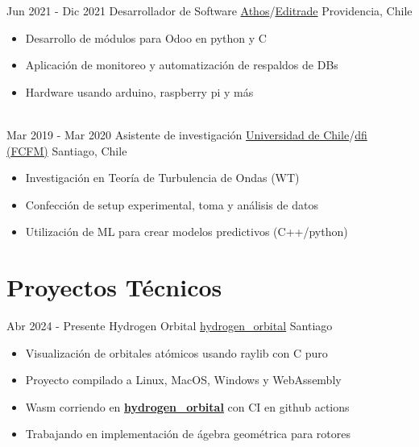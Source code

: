 \documentclass[letterpaper]{twentysecondcv} %
\begin{document}
\begin{twenty}
\twentyitem
    	{\small Jun 2021 -}
		{\small Dic 2021}
        {Desarrollador de Software}
        {\href{https://athos.cl/}{Athos}/\href{https://editrade.cl}{Editrade}}
        {\small Providencia, Chile}
        {
        \begin{itemize}
            \item Desarrollo de módulos para Odoo en python y C
            \item Aplicación de monitoreo y automatización de respaldos de DBs
            \item Hardware usando arduino, raspberry pi y más
        \end{itemize}}
        \\

\twentyitem
    	{\small Mar 2019 -}
		{\small Mar 2020}
        {Asistente de investigación}
        {\href{https://uchile.cl/}{Universidad de Chile}/\href{https://dfi.uchile.cl/}{dfi (FCFM)}}
        {\small Santiago, Chile}
        {
        \begin{itemize}
            \item Investigación en Teoría de Turbulencia de Ondas (WT)
            \item Confección de setup experimental, toma y análisis de datos
            \item Utilización de ML para crear modelos predictivos (C++/python)
        \end{itemize}}

\end{twenty}

\section{Proyectos Técnicos}
\begin{twenty}
	\twentyitem
    	{\small Abr 2024 -}
		{\small Presente}
        {Hydrogen Orbital}
        {\href{https://github.com/andonivizcaya/hydrogen_orbital}{hydrogen\_orbital}}
        {\small Santiago}
        {
        {\begin{itemize}
            \item Visualización de orbitales atómicos usando raylib con C puro
            \item Proyecto compilado a Linux, MacOS, Windows y WebAssembly
            \item Wasm corriendo en \href{https://andonivizcaya.github.io/hydrogen_orbital/}{\textbf{hydrogen\_orbital}} con CI en github actions
            \item Trabajando en implementación de ágebra geométrica para rotores
		\end{itemize}
        }}
\end{twenty}
\end{document}
